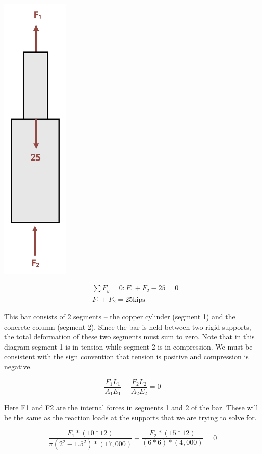 \documentclass[
  letterpaper,
  DIV=11,
  numbers=noendperiod]{scrreprt}
\begin{document}
\begin{tcolorbox}
\begin{tcolorbox}
\begin{center}
\includegraphics[width=1.26042in,height=\textheight]{images/PNGs/Example 5.6 part 2.png}
\end{center}

\[
\begin{aligned}
& \sum F_y=0: F_1+F_2-25=0 \\
& F_1+F_2=25 \mathrm{kips}
\end{aligned}
\]

This bar consists of 2 segments -- the copper cylinder (segment 1) and
the concrete column (segment 2). Since the bar is held between two rigid
supports, the total deformation of these two segments must sum to zero.
Note that in this diagram segment 1 is in tension while segment 2 is in
compression. We must be consistent with the sign convention that tension
is positive and compression is negative.

\[
\frac{F_1 L_1}{A_1 E_1}-\frac{F_2 L_2}{A_2 E_2}=0
\]

Here F1 and F2 are the internal forces in segments 1 and 2 of the bar.
These will be the same as the reaction loads at the supports that we are
trying to solve for.

\[
\frac{F_1 *(10 * 12)}{\pi\left(2^2-1.5^2\right) *(17,000)}-\frac{F_2 *(15 * 12)}{(6 * 6) *(4,000)}=0
\]


\end{tcolorbox}
\end{tcolorbox}
\end{document}
